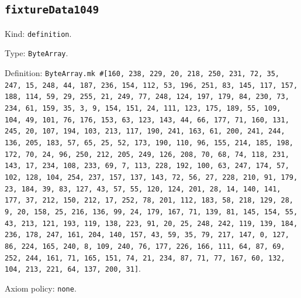 \documentclass[11pt]{article}
\begin{document}
\subsection*{\texttt{fixtureData1049}}
\noindent Kind: \texttt{definition}.\par
\noindent Type: \texttt{ByteArray}.\par
\noindent Definition: \texttt{ByteArray.mk \#[160, 238, 229, 20, 218, 250, 231, 72, 35, 247, 15, 248, 44, 187, 236, 154, 112, 53, 196, 251, 83, 145, 117, 157, 188, 114, 59, 29, 255, 21, 249, 77, 248, 124, 197, 179, 84, 230, 73, 234, 61, 159, 35, 3, 9, 154, 151, 24, 111, 123, 175, 189, 55, 109, 104, 49, 101, 76, 176, 153, 63, 123, 143, 44, 66, 177, 71, 160, 131, 245, 20, 107, 194, 103, 213, 117, 190, 241, 163, 61, 200, 241, 244, 136, 205, 183, 57, 65, 25, 52, 173, 190, 110, 96, 155, 214, 185, 198, 172, 70, 24, 96, 250, 212, 205, 249, 126, 208, 70, 68, 74, 118, 231, 143, 17, 234, 108, 233, 69, 7, 113, 228, 192, 100, 63, 247, 174, 57, 102, 128, 104, 254, 237, 157, 137, 143, 72, 56, 27, 228, 210, 91, 179, 23, 184, 39, 83, 127, 43, 57, 55, 120, 124, 201, 28, 14, 140, 141, 177, 37, 212, 150, 212, 17, 252, 78, 201, 112, 183, 58, 218, 129, 28, 9, 20, 158, 25, 216, 136, 99, 24, 179, 167, 71, 139, 81, 145, 154, 55, 43, 213, 121, 193, 119, 138, 223, 91, 20, 25, 248, 242, 119, 139, 184, 236, 178, 247, 161, 204, 140, 157, 43, 59, 35, 79, 217, 147, 0, 127, 86, 224, 165, 240, 8, 109, 240, 76, 177, 226, 166, 111, 64, 87, 69, 252, 244, 161, 71, 165, 151, 74, 21, 234, 87, 71, 77, 167, 60, 132, 104, 213, 221, 64, 137, 200, 31]}.\par
\noindent Axiom policy: \texttt{none}.\par
\end{document}
